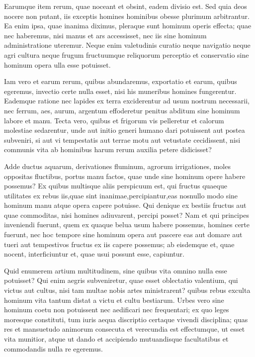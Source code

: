  Earumque item rerum, quae noceant et obsint, eadem divisio est. Sed quia deos nocere non putant, iis exceptis homines hominibus obesse plurimum arbitrantur. Ea enim ipsa, quae inanima diximus, pleraque sunt hominum operis effecta; quae nec haberemus, nisi manus et ars accessisset, nec iis sine hominum administratione uteremur. Neque enim valetudinis curatio neque navigatio neque agri cultura neque frugum fructuumque reliquorum perceptio et conservatio sine hominum opera ulla esse potuisset.

 Iam vero et earum rerum, quibus abundaremus, exportatio et earum, quibus egeremus, invectio certe nulla esset, nisi his muneribus homines fungerentur. Eademque ratione nec lapides ex terra exciderentur ad usum nostrum necessarii, nec ferrum, aes, aurum, argentum effoderetur penitus abditum sine hominum labore et manu. Tecta vero, quibus et frigorum vis pelleretur et calorum molestiae sedarentur, unde aut initio generi humano dari potuissent aut postea subveniri, si aut vi tempestatis aut terrae motu aut vetustate cecidissent, nisi communis vita ab hominibus harum rerum auxilia petere didicisset?

 Adde ductus aquarum, derivationes fluminum, agrorum irrigationes, moles oppositas fluctibus, portus manu factos, quae unde sine hominum opere habere possemus? Ex quibus multisque aliis perspicuum est, qui fructus quaeque utilitates ex rebus iis,quae sint inanimae,percipiantur,eas nosnullo modo sine hominum manu atque opera capere potuisse. Qui denique ex bestiis fructus aut quae commoditas, nisi homines adiuvarent, percipi posset? Nam et qui principes inveniendi fuerunt, quem ex quaque belua usum habere possemus, homines certe fuerunt, nec hoc tempore sine hominum opera aut pascere eas aut domare aut tueri aut tempestivos fructus ex iis capere possemus; ab eisdemque et, quae nocent, interficiuntur et, quae usui possunt esse, capiuntur.

 Quid enumerem artium multitudinem, sine quibus vita omnino nulla esse potuisset? Qui enim aegris subveniretur, quae esset oblectatio valentium, qui victus aut cultus, nisi tam multae nobis artes ministrarent? quibus rebus exculta hominum vita tantum distat a victu et cultu bestiarum. Urbes vero sine hominum coetu non potuissent nec aedificari nec frequentari; ex quo leges moresque constituti, tum iuris aequa discriptio certaque vivendi disciplina; quas res et mansuetudo animorum consecuta et verecundia est effectumque, ut esset vita munitior, atque ut dando et accipiendo mutuandisque facultatibus et commodandis nulla re egeremus.


